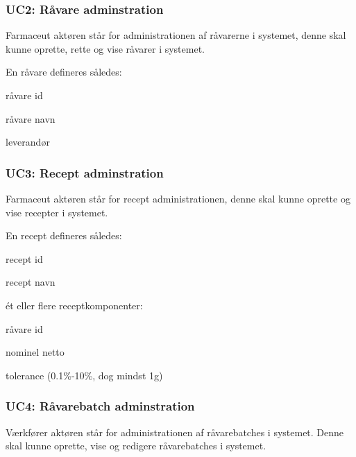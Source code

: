 \documentclass[a4paper]{article}
\newenvironment{my_itemize}
{\begin{itemize}
  \setlength{\itemsep}{1pt}
  \setlength{\parskip}{0pt}
  \setlength{\parsep}{0pt}}
{\end{itemize}}
\begin{document}

\subsubsection*{UC2: Råvare adminstration} %

Farmaceut aktøren står for administrationen af råvarerne i systemet, denne skal kunne oprette, rette og vise råvarer i systemet.

En råvare defineres således:

\begin{my_itemize}
  \item råvare id
  \item råvare navn
  \item leverandør
\end{my_itemize}


\subsubsection*{UC3: Recept adminstration} %

Farmaceut aktøren står for recept administrationen, denne skal kunne oprette og vise recepter i systemet.

En recept defineres således:
\begin{my_itemize}
  \item recept id
  \item recept navn
  \item ét eller flere receptkomponenter:
    \begin{my_itemize}
      \item råvare id
      \item nominel netto
      \item tolerance (0.1\%-10\%, dog mindst 1g)
    \end{my_itemize}
\end{my_itemize}


\subsubsection*{UC4: Råvarebatch adminstration} %

Værkfører aktøren står for administrationen af råvarebatches i systemet. Denne skal kunne oprette, vise og redigere råvarebatches i systemet. 
\end{document}
